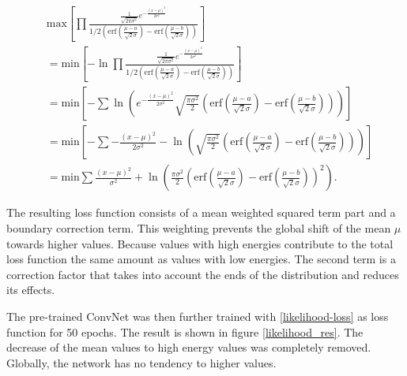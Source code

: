 \documentclass[12pt, a4paper]{thesis}
\begin{document}
\begin{align}
&\text{max}\left[ \prod \frac{\frac{1}{\sqrt{2\pi \sigma^2}}
      e^{-\frac{(x-\mu)^2}{2
          \sigma^2}}}{1/2\left(\text{erf}\left(\frac{\mu-a}{\sqrt{2}\sigma}\right)
      - \text{erf}\left(\frac{\mu-b}{\sqrt{2}\sigma}\right)\right)}
    \right]\\ &=\text{min}\left[ -\ln \prod \frac{\frac{1}{\sqrt{2\pi
          \sigma^2}} e^{-\frac{(x-\mu)^2}{2
          \sigma^2}}}{1/2\left(\text{erf}\left(\frac{\mu-a}{\sqrt{2}\sigma}\right)
      -
      \text{erf}\left(\frac{\mu-b}{\sqrt{2}\sigma}\right)\right)}\right]
  \\ &=\text{min}\left[ -\sum \ln(e^{-\frac{(x-\mu)^2}{2
        \sigma^2}}{\sqrt{\frac{\pi
          \sigma^2}{2}}\left(\text{erf}\left(\frac{\mu-a}{\sqrt{2}\sigma}\right)
      -
      \text{erf}\left(\frac{\mu-b}{\sqrt{2}\sigma}\right)\right)})\right]
  \\ &=\text{min}\left[ -\sum -\frac{(x-\mu)^2}{2
      \sigma^2}-\ln(\sqrt{\frac{\pi
        \sigma^2}{2}}\left(\text{erf}\left(\frac{\mu-a}{\sqrt{2}\sigma}\right)
    -
    \text{erf}\left(\frac{\mu-b}{\sqrt{2}\sigma}\right)\right))\right]
  \\ &=\text{min} \sum \frac{(x-\mu)^2}{\sigma^2} + \ln(\frac{\pi
    \sigma^2}{2}\left(\text{erf}\left(\frac{\mu-a}{\sqrt{2}\sigma}\right)
  -
  \text{erf}\left(\frac{\mu-b}{\sqrt{2}\sigma}\right)\right)^2). \label{likelihood-loss}
\end{align}


The resulting loss function consists of a mean weighted squared term
part and a boundary correction term. This weighting prevents the
global shift of the mean $\mu$ towards higher values. Because values
with high energies contribute to the total loss function the same
amount as values with low energies. The second term is a correction
factor that takes into account the ends of the distribution and
reduces its effects.

  The pre-trained ConvNet was then further trained with
\eqref{likelihood-loss} as loss function for 50 epochs. The result is
shown in figure \ref{likelihood_res}. The decrease of the mean values
to high energy values was completely removed. Globally, the network
has no tendency to higher values.
\end{document}

